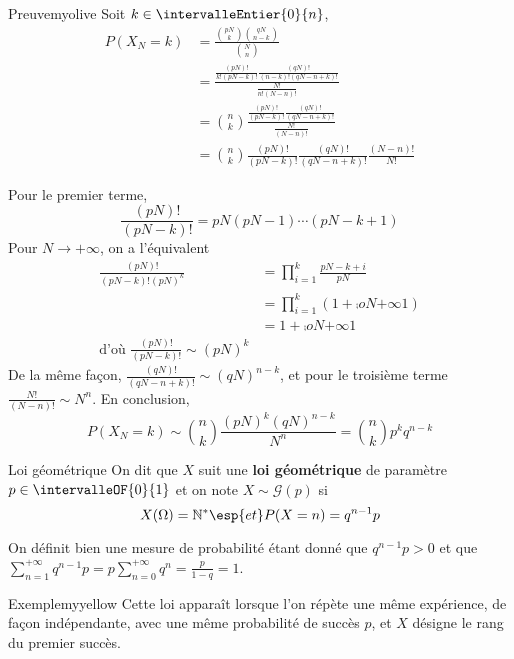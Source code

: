     \begin{demo}{Preuve}{myolive}
        Soit $k \in \intervalleEntier{0}{n}$,
        \begin{align*}
            P(X_N = k) &= \frac{\binom{pN}{k} \binom{qN}{n-k}}{\binom{N}{n}} \\
            &= \frac{\frac{(pN)!}{k!(pN -k)!}\frac{(qN)!}{(n-k)!(qN - n + k)!}}{\frac{N!}{n!(N-n)!}} \\
            &= \binom{n}{k} \frac{\frac{(pN)!}{(pN -k)!}\frac{(qN)!}{(qN - n + k)!}}{\frac{N!}{(N-n)!}} \\
            &= \binom{n }{k} \frac{(pN)!}{(pN-k)!} \frac{(qN)!}{(qN - n + k)!} \frac{(N- n)!}{N!} 
        \end{align*}

        Pour le premier terme, 
        \[ \frac{(pN)!}{(pN - k)!} = pN (pN - 1) \cdots (pN - k + 1) \]    
        Pour $N \to +\infty$, on a l’équivalent 
        \begin{align*}
            \frac{(pN)!}{(pN - k)!(pN)^k} &= \prod_{i=1}^{k} \frac{pN - k + i}{pN} \\
            &= \prod_{i=1}^{k} (1 + \comp{o}{N}{+\infty}{1}) \\
            &= 1 + \comp{o}{N}{+\infty}{1} \\
            \text{d’où } \frac{(pN)!}{(pN-k)!} \sim (pN)^k 
        \end{align*}
        De la même façon, $\frac{(qN)!}{(qN - n + k)!} \sim (qN)^{n-k}$, et pour le troisième terme $\frac{N!}{(N-n)!} \sim N^n$. 
        En conclusion, 
        \[ P(X_N = k) \sim \binom{n}{k} \frac{(pN)^k (qN)^{n-k}}{N^n} = \binom{n}{k} p^k q^{n-k} \]    
    \end{demo}

    \begin{defi}{Loi géométrique}{}
        On dit que $X$ suit une \textbf{loi géométrique} de paramètre $p \in \intervalleOF{0}{1}$ et on note $X \sim \mathcal{G}(p)$ si 
        \[ X(\Omega) = \mathbb{N}^* \esp{et} P(X = n) = q^{n-1} p \]   
    \end{defi}

    On définit bien une mesure de probabilité étant donné que $q^{n-1} p > 0$ et que $\sum_{n=1}^{+\infty} q^{n-1}p = p \sum_{n=0}^{+\infty} q^n  = \frac{p}{1-q} = 1$.

    \begin{omed}{Exemple}{myyellow}
        Cette loi apparaît lorsque l’on répète une même expérience, de façon indépendante, avec une même probabilité de succès $p$, et $X$ désigne le rang du premier succès.
    \end{omed}

